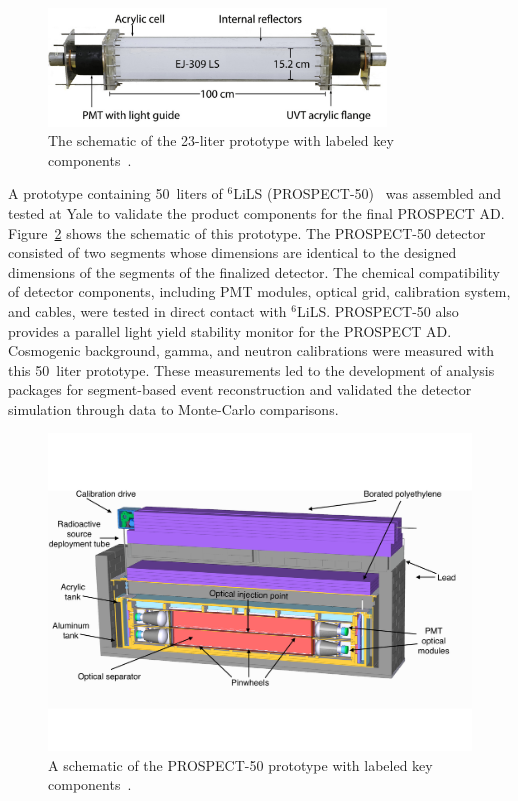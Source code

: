 \begin{figure}[h!]
    \centering
    \includegraphics[width=0.8\textwidth]{Figures/P20_InternalReflectors.jpg}
    \caption[The schematic of the 23-liter prototype]{The schematic of the 23-liter prototype with labeled key components~\cite{bib:P20}.}
    \label{fig:P20a}
\end{figure}

A prototype containing 50~liters of $^6$LiLS (PROSPECT-50)~\cite{bib:P50} was assembled and tested at Yale to validate the product components for the final PROSPECT AD.
Figure~\ref{fig:P50x} shows the schematic of this prototype.
The PROSPECT-50 detector consisted of two segments whose dimensions are identical to the designed dimensions of the segments of the finalized detector.
The chemical compatibility of detector components, including PMT modules, optical grid, calibration system, and cables, were tested in direct contact with $^6$LiLS.
PROSPECT-50 also provides a parallel light yield stability monitor for the PROSPECT AD. 
Cosmogenic background, gamma, and neutron calibrations were measured with this 50~liter prototype.
These measurements led to the development of analysis packages for segment-based event reconstruction and validated the detector simulation through data to Monte-Carlo comparisons.

\begin{figure}[h!]
    \centering
    \includegraphics[width=0.8	\textwidth]{Figures/P50.pdf}
    \caption[A schematic of the 50-liter prototype]{A schematic of the PROSPECT-50 prototype with labeled key components~\cite{bib:P50}.}
    \label{fig:P50x}
\end{figure}

